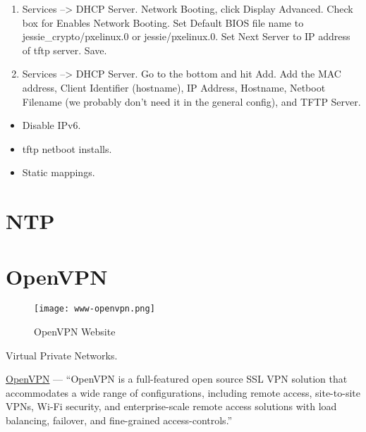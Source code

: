 \begin{enumerate}
 \item Services --> DHCP Server. Network Booting, click Display Advanced. Check box for Enables Network Booting. Set Default BIOS file name to jessie\_crypto/pxelinux.0 or jessie/pxelinux.0. Set Next Server to IP address of tftp server. Save.
 \item Services --> DHCP Server. Go to the bottom and hit Add. Add the MAC address, Client Identifier (hostname), IP Address, Hostname, Netboot Filename (we probably don't need it in the general config), and TFTP Server.
\end{enumerate}

\begin{itemize}
 \item Disable IPv6.
 \item tftp netboot installs.
 \item Static mappings.
\end{itemize}


\section{NTP}


\section{OpenVPN}
\begin{figure}[h!]
\begin{center}
\texttt{[image: www-openvpn.png]}
 \caption{OpenVPN Website}
 \label{fig:www-openvpn}
\end{center}
\end{figure}


Virtual Private Networks.


\href{https://www.openvpn.net/}{OpenVPN} --- ``OpenVPN is a full-featured open source SSL VPN solution that accommodates a wide range of configurations, including remote access, site-to-site VPNs, Wi-Fi security, and enterprise-scale remote access solutions with load balancing, failover, and fine-grained access-controls.''


